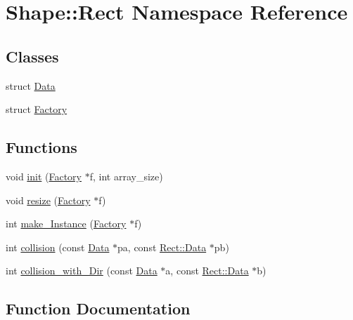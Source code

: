 \hypertarget{namespace_shape_1_1_rect}{}\section{Shape\+:\+:Rect Namespace Reference}
\label{namespace_shape_1_1_rect}
\subsection*{Classes}
\begin{DoxyCompactItemize}
\item 
struct \mbox{\hyperlink{struct_shape_1_1_rect_1_1_data}{Data}}
\item 
struct \mbox{\hyperlink{struct_shape_1_1_rect_1_1_factory}{Factory}}
\end{DoxyCompactItemize}
\subsection*{Functions}
\begin{DoxyCompactItemize}
\item 
void \mbox{\hyperlink{namespace_shape_1_1_rect_a2afc04d1f1a291cb1a08b1b1770dc116}{init}} (\mbox{\hyperlink{struct_shape_1_1_rect_1_1_factory}{Factory}} $\ast$f, int array\+\_\+size)
\item 
void \mbox{\hyperlink{namespace_shape_1_1_rect_a884c1d22d2af0772a9ab2121819e2631}{resize}} (\mbox{\hyperlink{struct_shape_1_1_rect_1_1_factory}{Factory}} $\ast$f)
\item 
int \mbox{\hyperlink{namespace_shape_1_1_rect_aea84bb9ed2eff065d6e0e7f902ef8ff4}{make\+\_\+\+Instance}} (\mbox{\hyperlink{struct_shape_1_1_rect_1_1_factory}{Factory}} $\ast$f)
\item 
int \mbox{\hyperlink{namespace_shape_1_1_rect_a8a106f527c77e8cb1903712a90699e8b}{collision}} (const \mbox{\hyperlink{struct_shape_1_1_rect_1_1_data}{Data}} $\ast$pa, const \mbox{\hyperlink{struct_shape_1_1_rect_1_1_data}{Rect\+::\+Data}} $\ast$pb)
\item 
int \mbox{\hyperlink{namespace_shape_1_1_rect_accfbe0e95cb57179dea7daa7a0fd79f8}{collision\+\_\+with\+\_\+\+Dir}} (const \mbox{\hyperlink{struct_shape_1_1_rect_1_1_data}{Data}} $\ast$a, const \mbox{\hyperlink{struct_shape_1_1_rect_1_1_data}{Rect\+::\+Data}} $\ast$b)
\end{DoxyCompactItemize}


\subsection{Function Documentation}
\mbox{\label{namespace_shape_1_1_rect_a8a106f527c77e8cb1903712a90699e8b}} 
